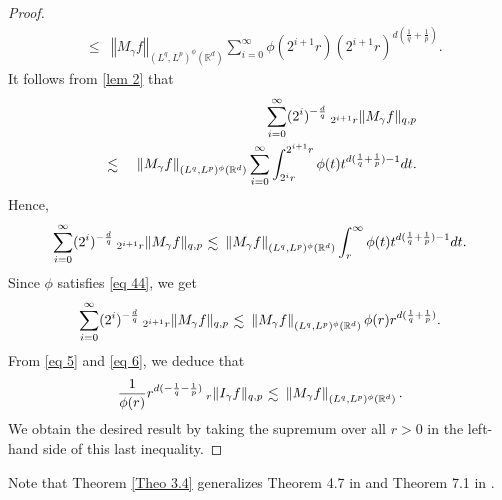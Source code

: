 \documentclass[10pt,a4paper]{amsart}
\numberwithin{equation}{section}
\numberwithin{equation}{section}
\def\lsim{\raisebox{-1ex}{$~\stackrel{\textstyle <}{\sim}~$}}
\begin{document}
\begin{proof}
\begin{eqnarray*}
&\leq& \left\Vert M_{\gamma}f \right\Vert_{(L^{q},L^{p})^{\phi }(\mathbb{R}^{d})} \sum^{\infty}_{i=0} \phi(2^{i+1}r)(2^{i+1}r)^{d(\frac{1}{q}+\frac{1}{p})}.
\end{eqnarray*}
It follows from \eqref{lem 2} that
\begin{eqnarray*}
& &\sum\limits^{\infty}_{i=0} (2^{i})^{-\frac{d}{q}}  \: _{2^{i+1}r}\Vert M_{\gamma}f \Vert_{q,p}\\ 
&\lsim & \left\Vert M_{\gamma}f \right\Vert_{(L^{q},L^{p})^{\phi }(\mathbb{R}^{d})} \sum^{\infty}_{i=0} \displaystyle\int_{2^{i}r}^{2^{i+1}r} \phi(t)t^{d(\frac{1}{q}+\frac{1}{p})-1} dt. 
\end{eqnarray*}
Hence,
$$\sum\limits^{\infty}_{i=0} (2^{i})^{-\frac{d}{q}}  \: _{2^{i+1}r}\Vert M_{\gamma}f \Vert_{q,p}  \lsim  \left\Vert M_{\gamma}f \right\Vert_{(L^{q},L^{p})^{\phi }(\mathbb{R}^{d})} \displaystyle\int_{r}^{\infty} \phi(t)t^{d(\frac{1}{q}+\frac{1}{p})-1} dt.  $$
Since $\phi$ satisfies \eqref{eq 44}, we get 
\begin{equation}\label{eq 6}
\sum\limits^{\infty}_{i=0} (2^{i})^{-\frac{d}{q}}  \: _{2^{i+1}r}\Vert M_{\gamma}f \Vert_{q,p} \lsim  \left\Vert M_{\gamma}f \right\Vert_{(L^{q},L^{p})^{\phi }(\mathbb{R}^{d})}\phi(r)r^{d(\frac{1}{q}+\frac{1}{p})}.
\end{equation}
From \eqref{eq 5} and \eqref{eq 6}, we deduce that 
\begin{equation*} 
\label{eq 7} 
\frac{1}{\phi(r)}r^{d(-\frac{1}{q}-\frac{1}{p})} \: _{r}\Vert I_{\gamma}f \Vert_{q,p} \lsim \left\Vert M_{\gamma}f \right\Vert_{(L^{q},L^{p})^{\phi }(\mathbb{R}^{d})}.
\end{equation*}
We obtain the desired result by taking the supremum over all $ r > 0 $ in
the left-hand side of this last inequality.
\end{proof}
Note that Theorem \ref{Theo 3.4} generalizes Theorem 4.7 in \cite{JF} and Theorem 7.1 in \cite{GoM}.
\end{document}
